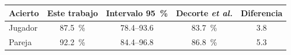 \begin{tabular}{lcccc}
\toprule
\textbf{Acierto} & \textbf{Este trabajo} & \textbf{Intervalo 95~\%} & \textbf{Decorte \textit{et al.}} & \textbf{Diferencia} \\
\midrule
Jugador & \SI{87.5}{\percent} & \num{78.4}--\num{93.6} & \SI{83.7}{\percent} & \num[retain-explicit-plus]{+3.8} \\
Pareja & \SI{92.2}{\percent} & \num{84.4}--\num{96.8} & \SI{86.8}{\percent} & \num[retain-explicit-plus]{+5.3} \\
\bottomrule
\end{tabular}
